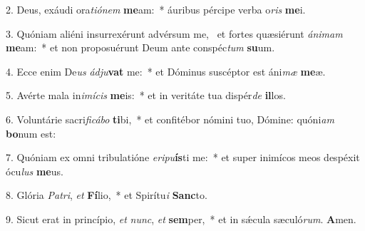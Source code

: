 2. Deus, exáudi ora\textit{ti}\textit{ó}\textit{nem} \textbf{me}am:~*  áuribus pércipe verba o\textit{ris} \textbf{me}i.\

3. Quóniam aliéni insurrexérunt advérsum me, \dag\  et fortes quæsiérunt \textit{á}\textit{ni}\textit{mam} \textbf{me}am:~*  et non proposuérunt Deum ante conspéc\textit{tum} \textbf{su}um.\

4. Ecce enim De\textit{us} \textit{ád}\textit{ju}\textbf{vat} me:~*  et Dóminus suscéptor est áni\textit{mæ} \textbf{me}æ.\

5. Avérte mala in\textit{i}\textit{mí}\textit{cis} \textbf{me}is:~*  et in veritáte tua dispér\textit{de} \textbf{il}los.\

6. Voluntárie sacri\textit{fi}\textit{cá}\textit{bo} \textbf{ti}bi,~*  et confitébor nómini tuo, Dómine: quóni\textit{am} \textbf{bo}num est:\

7. Quóniam ex omni tribulatióne \textit{e}\textit{ri}\textit{pu}\textbf{ís}ti me:~*  et super inimícos meos despéxit ócu\textit{lus} \textbf{me}us.\

8. Glória \textit{Pa}\textit{tri}, \textit{et} \textbf{Fí}lio,~*  et Spirítu\textit{i} \textbf{Sanc}to.\

9. Sicut erat in princípio, \textit{et} \textit{nunc}, \textit{et} \textbf{sem}per,~*  et in sǽcula sæculó\textit{rum}. \textbf{A}men.\

